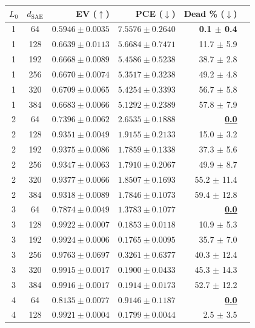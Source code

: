 \begin{table}[ht]
\begin{tabular}{ccrrrr}
\toprule
$L_0$ & $d_\text{SAE}$ & EV ($\uparrow$) & PCE ($\downarrow$) & Dead \% ($\downarrow$) \\
\midrule
  1 & 64 & $0.5946 \pm 0.0035$ & $7.5576 \pm 0.2640$ & \textbf{0.1 $\pm$ 0.4} \\
  1 & 128 & $0.6639 \pm 0.0113$ & $5.6684 \pm 0.7471$ & 11.7 $\pm$ 5.9 \\
  1 & 192 & $0.6668 \pm 0.0089$ & $5.4586 \pm 0.5238$ & 38.7 $\pm$ 2.8 \\
  1 & 256 & $0.6670 \pm 0.0074$ & $5.3517 \pm 0.3238$ & 49.2 $\pm$ 4.8 \\
  1 & 320 & $\mathbf{0.6709 \pm 0.0065}$ & $5.4254 \pm 0.3393$ & 56.7 $\pm$ 5.8 \\
  1 & 384 & $0.6683 \pm 0.0066$ & $\mathbf{5.1292 \pm 0.2389}$ & 57.8 $\pm$ 7.9 \\
\midrule
  2 & 64 & $0.7396 \pm 0.0062$ & $2.6535 \pm 0.1888$ & \underline{\textbf{0.0}} \\
  2 & 128 & $0.9351 \pm 0.0049$ & $1.9155 \pm 0.2133$ & 15.0 $\pm$ 3.2 \\
  2 & 192 & $0.9375 \pm 0.0086$ & $1.7859 \pm 0.1338$ & 37.3 $\pm$ 5.6 \\
  2 & 256 & $0.9347 \pm 0.0063$ & $1.7910 \pm 0.2067$ & 49.9 $\pm$ 8.7 \\
  2 & 320 & $\mathbf{0.9377 \pm 0.0066}$ & $1.8507 \pm 0.1693$ & 55.2 $\pm$ 11.4 \\
  2 & 384 & $0.9318 \pm 0.0089$ & $\mathbf{1.7846 \pm 0.1073}$ & 59.4 $\pm$ 12.8 \\
\midrule
  3 & 64 & $0.7874 \pm 0.0049$ & $1.3783 \pm 0.1077$ & \underline{\textbf{0.0}} \\
  3 & 128 & $0.9922 \pm 0.0007$ & $0.1853 \pm 0.0118$ & 10.9 $\pm$ 5.3 \\
  3 & 192 & \underline{$\mathbf{0.9924 \pm 0.0006}$} & $\mathbf{0.1765 \pm 0.0095}$ & 35.7 $\pm$ 7.0 \\
  3 & 256 & $0.9763 \pm 0.0697$ & $0.3261 \pm 0.6377$ & 40.3 $\pm$ 12.4 \\
  3 & 320 & $0.9915 \pm 0.0017$ & $0.1900 \pm 0.0433$ & 45.3 $\pm$ 14.3 \\
  3 & 384 & $0.9916 \pm 0.0017$ & $0.1914 \pm 0.0173$ & 52.7 $\pm$ 12.2 \\
\midrule
  4 & 64 & $0.8135 \pm 0.0077$ & $0.9146 \pm 0.1187$ & \underline{\textbf{0.0}} \\
  4 & 128 & $0.9921 \pm 0.0004$ & $\mathbf{0.1799 \pm 0.0044}$ & 2.5 $\pm$ 3.5 \\

\end{tabular}
\end{table}
